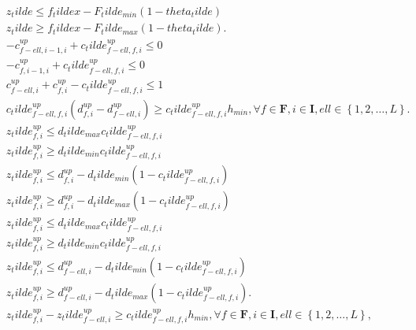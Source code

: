 \begin{align}
  & z_tilde \leq f_tilde x - F_tilde_{min} \left(1 - theta_tilde\right) \tag{eq\_0059\_c} \\
  & z_tilde \geq f_tilde x - F_tilde_{max} \left(1 - theta_tilde\right) . \tag{eq\_0059\_d} \\
  & - c_{f - \mathit{ell} , i - 1 , i}^{up} + c_tilde_{f - \mathit{ell} , f , i}^{up} \leq 0 \tag{eq\_0060\_a} \\
  & - c_{f , i - 1 , i}^{up} + c_tilde_{f - \mathit{ell} , f , i}^{up} \leq 0 \tag{eq\_0060\_b} \\
  & c_{f - \mathit{ell} , i}^{up} + c_{f , i}^{up} - c_tilde_{f - \mathit{ell} , f , i}^{up} \leq 1 \tag{eq\_0060\_c} \\
  & c_tilde_{f - \mathit{ell} , f , i}^{up} \left(d_{f , i}^{up} - d_{f - \mathit{ell} , i}^{up}\right) \geq c_tilde_{f - \mathit{ell} , f , i}^{up} h_{min} , \forall f \in \mathbf{F} , i \in \mathbf{I} , \mathit{ell} \in \left\{1 , 2 , \ldots , L\right\} . \tag{eq\_0062} \\
  & z_tilde_{f , i}^{up} \leq d_tilde_{max} c_tilde_{f - \mathit{ell} , f , i}^{up} \tag{eq\_0063\_a} \\
  & z_tilde_{f , i}^{up} \geq d_tilde_{min} c_tilde_{f - \mathit{ell} , f , i}^{up} \tag{eq\_0063\_b} \\
  & z_tilde_{f , i}^{up} \leq d_{f , i}^{up} - d_tilde_{min} \left(1 - c_tilde_{f - \mathit{ell} , f , i}^{up}\right) \tag{eq\_0063\_c} \\
  & z_tilde_{f , i}^{up} \geq d_{f , i}^{up} - d_tilde_{max} \left(1 - c_tilde_{f - \mathit{ell} , f , i}^{up}\right) \tag{eq\_0063\_d} \\
  & z_tilde_{f , i}^{up} \leq d_tilde_{max} c_tilde_{f - \mathit{ell} , f , i}^{up} \tag{eq\_0064\_a} \\
  & z_tilde_{f , i}^{up} \geq d_tilde_{min} c_tilde_{f - \mathit{ell} , f , i}^{up} \tag{eq\_0064\_b} \\
  & z_tilde_{f , i}^{up} \leq d_{f - \mathit{ell} , i}^{up} - d_tilde_{min} \left(1 - c_tilde_{f - \mathit{ell} , f , i}^{up}\right) \tag{eq\_0064\_c} \\
  & z_tilde_{f , i}^{up} \geq d_{f - \mathit{ell} , i}^{up} - d_tilde_{max} \left(1 - c_tilde_{f - \mathit{ell} , f , i}^{up}\right) . \tag{eq\_0064\_d} \\
  & z_tilde_{f , i}^{up} - z_tilde_{f - \mathit{ell} , i}^{up} \geq c_tilde_{f - \mathit{ell} , f , i}^{up} h_{min} , \forall f \in \mathbf{F} , i \in \mathbf{I} , \mathit{ell} \in \left\{1 , 2 , \ldots , L\right\} , \tag{eq\_0066} \\
\end{align}
